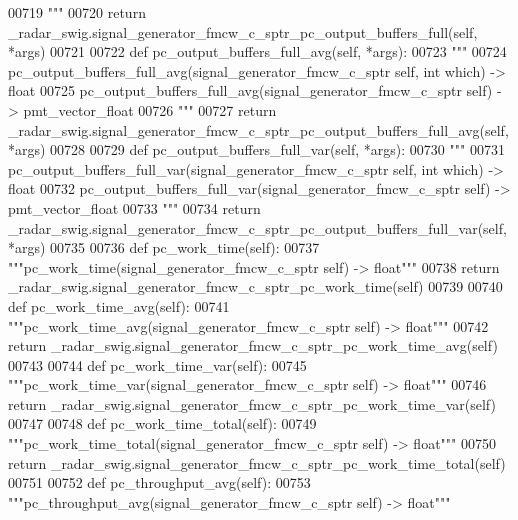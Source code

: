 \begin{DoxyCode}
{{{{00719 \textcolor{stringliteral}{        """}
00720         \textcolor{keywordflow}{return} \_radar\_swig.signal\_generator\_fmcw\_c\_sptr\_pc\_output\_buffers\_full(self, *args)
00721 
00722     \textcolor{keyword}{def }pc_output_buffers_full_avg(self, *args):
00723         \textcolor{stringliteral}{"""}
00724 \textcolor{stringliteral}{        pc\_output\_buffers\_full\_avg(signal\_generator\_fmcw\_c\_sptr self, int which) -> float}
00725 \textcolor{stringliteral}{        pc\_output\_buffers\_full\_avg(signal\_generator\_fmcw\_c\_sptr self) -> pmt\_vector\_float}
00726 \textcolor{stringliteral}{        """}
00727         \textcolor{keywordflow}{return} \_radar\_swig.signal\_generator\_fmcw\_c\_sptr\_pc\_output\_buffers\_full\_avg(self, *args)
00728 
00729     \textcolor{keyword}{def }pc_output_buffers_full_var(self, *args):
00730         \textcolor{stringliteral}{"""}
00731 \textcolor{stringliteral}{        pc\_output\_buffers\_full\_var(signal\_generator\_fmcw\_c\_sptr self, int which) -> float}
00732 \textcolor{stringliteral}{        pc\_output\_buffers\_full\_var(signal\_generator\_fmcw\_c\_sptr self) -> pmt\_vector\_float}
00733 \textcolor{stringliteral}{        """}
00734         \textcolor{keywordflow}{return} \_radar\_swig.signal\_generator\_fmcw\_c\_sptr\_pc\_output\_buffers\_full\_var(self, *args)
00735 
00736     \textcolor{keyword}{def }pc_work_time(self):
00737         \textcolor{stringliteral}{"""pc\_work\_time(signal\_generator\_fmcw\_c\_sptr self) -> float"""}
00738         \textcolor{keywordflow}{return} \_radar\_swig.signal\_generator\_fmcw\_c\_sptr\_pc\_work\_time(self)
00739 
00740     \textcolor{keyword}{def }pc_work_time_avg(self):
00741         \textcolor{stringliteral}{"""pc\_work\_time\_avg(signal\_generator\_fmcw\_c\_sptr self) -> float"""}
00742         \textcolor{keywordflow}{return} \_radar\_swig.signal\_generator\_fmcw\_c\_sptr\_pc\_work\_time\_avg(self)
00743 
00744     \textcolor{keyword}{def }pc_work_time_var(self):
00745         \textcolor{stringliteral}{"""pc\_work\_time\_var(signal\_generator\_fmcw\_c\_sptr self) -> float"""}
00746         \textcolor{keywordflow}{return} \_radar\_swig.signal\_generator\_fmcw\_c\_sptr\_pc\_work\_time\_var(self)
00747 
00748     \textcolor{keyword}{def }pc_work_time_total(self):
00749         \textcolor{stringliteral}{"""pc\_work\_time\_total(signal\_generator\_fmcw\_c\_sptr self) -> float"""}
00750         \textcolor{keywordflow}{return} \_radar\_swig.signal\_generator\_fmcw\_c\_sptr\_pc\_work\_time\_total(self)
00751 
00752     \textcolor{keyword}{def }pc_throughput_avg(self):
00753         \textcolor{stringliteral}{"""pc\_throughput\_avg(signal\_generator\_fmcw\_c\_sptr self) -> float"""}
}}}}
\end{DoxyCode}
